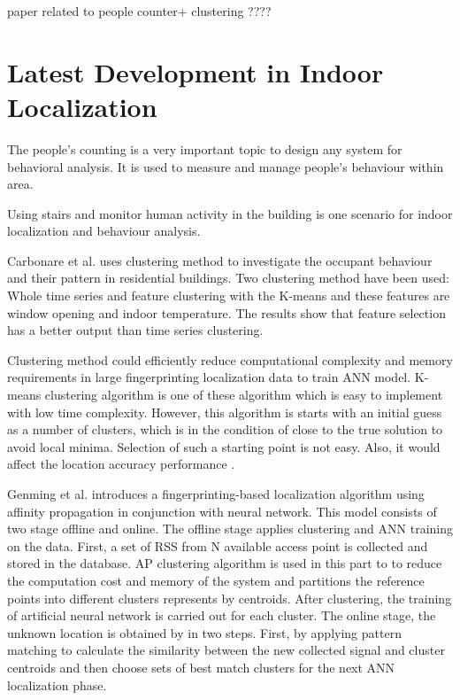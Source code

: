 \documentclass[../UNBThesis2.tex]{subfiles}
\begin{document}
paper related to people counter+ clustering ????




\section{Latest Development in Indoor Localization }
The people’s counting is a very important topic to design any system for behavioral analysis. It is used to measure and manage people’s behaviour within area.

Using stairs and monitor human activity in the building is one scenario for indoor localization and behaviour analysis.


Carbonare et al. \cite{carbonare2018clustering} uses clustering method to investigate the occupant behaviour and their pattern in residential buildings. Two clustering method have been used: Whole time series and feature clustering with the K-means and these features are window opening and indoor temperature. The results show that feature selection has a better output than time series clustering.
   


Clustering method could efficiently reduce computational complexity and memory requirements in large fingerprinting localization data to train ANN model. K-means clustering algorithm is one of these algorithm which is easy to implement with low time complexity. However, this algorithm is starts with an initial guess as a number of clusters, which is in the condition of close to the true solution to avoid local minima. Selection of such a starting point is not easy. Also, it would affect the location accuracy performance \cite{das2007automatic, ding2013fingerprinting}.

Genming et al. \cite{ding2013fingerprinting} introduces a fingerprinting-based localization algorithm using affinity propagation in conjunction with neural network. 
This model consists of two stage offline and online. The offline stage applies clustering and ANN training on the data. First,  a set of RSS from N available access point is collected and stored in the database. AP clustering algorithm is used in this part to to reduce the computation cost and memory of the system and partitions the reference points into different clusters represents by centroids. After clustering, the training of artificial neural network is carried out for each cluster.
The online stage, the unknown location is obtained by in two steps. First, by applying pattern matching to calculate the similarity between the new collected signal and cluster centroids and then choose sets of best match clusters for the next ANN localization phase.
\end{document}
